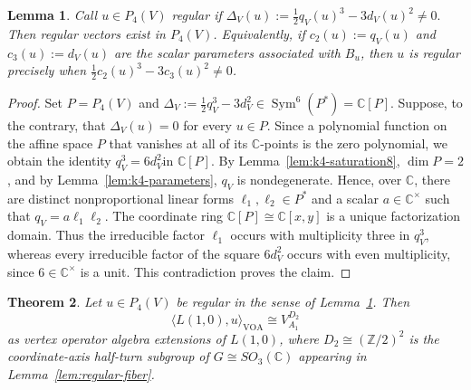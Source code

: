 \documentclass[12pt,leqno]{amsart}
\numberwithin{equation}{section} \newtheorem{thm}{Theorem}[section] \newtheorem{lem}[thm]{Lemma} \newtheorem{ex}[thm]{Example} \newtheorem{prop}[thm]{Proposition} \newtheorem{cor}[thm]{Corollary} \newtheorem{defi}[thm]{Definition} \newtheorem{rmk}[thm]{Remark} \newtheorem{notation}[thm]{Notation}
\newcommand{\Sym}{\operatorname{Sym}}
\def\Z{\mathbb{Z}} \def\N{\mathbb{N}} \def\A{\mathbb{A}} \def\C{\mathbb{C}} \def\R{\mathbb{R}} \def\Q{\mathbb{Q}} \def\F{\mathbb{F}}
\begin{document}
\begin{lem}\label{lem:regular-primary}
Call $u\in P_4(V)$ \emph{regular} if \(\Delta_V(u):=\frac12q_V(u)^3-3d_V(u)^2\ne0.\) Then regular vectors exist in $P_4(V)$. Equivalently, if \(c_2(u):=q_V(u)\) and \(c_3(u):=d_V(u)\) are the scalar parameters associated with $B_u$, then $u$ is regular precisely when \(\frac12c_2(u)^3-3c_3(u)^2\ne0\).
\end{lem}

\begin{proof}
Set $P=P_4(V)$ and \(\Delta_V:=\frac12q_V^3-3d_V^2\in\Sym^6(P^*)=\C[P]\). Suppose, to the contrary, that $\Delta_V(u)=0$ for every $u\in P$. Since a polynomial function on the affine space $P$ that vanishes at all of its $\C$-points is the zero polynomial, we obtain the identity \(q_V^3=6d_V^2 \text{in }\C[P].\) By Lemma~\ref{lem:k4-saturation8}, $\dim P=2$, and by Lemma~\ref{lem:k4-parameters}, $q_V$ is nondegenerate. Hence, over $\C$, there are distinct nonproportional linear forms $\ell_1,\ell_2\in P^*$ and a scalar $a\in\C^\times$ such that \(q_V=a\ell_1\ell_2\). The coordinate ring \(\C[P]\cong\C[x,y]\) is a unique factorization domain. Thus the irreducible factor $\ell_1$ occurs with multiplicity three in $q_V^3$, whereas every irreducible factor of the square $6d_V^2$ occurs with even multiplicity, since $6\in\C^\times$ is a unit. This contradiction proves the claim.
\end{proof}

\begin{thm}\label{thm:k4-D2}
Let $u\in P_4(V)$ be regular in the sense of Lemma~\ref{lem:regular-primary}. Then
\[
\langle L(1,0),u\rangle_{\mathrm{VOA}}\cong V_{A_1}^{D_2}
\]
as vertex operator algebra extensions of $L(1,0)$, where $D_2\cong(\Z/2)^2$ is the coordinate-axis half-turn subgroup of $G\cong SO_3(\C)$ appearing in Lemma~\ref{lem:regular-fiber}.
\end{thm}
\end{document}
